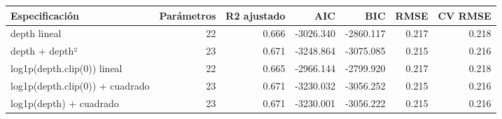 \begin{tabular}{lrrrrrr}
\toprule
Especificación & Parámetros & R2 ajustado & AIC & BIC & RMSE & CV RMSE \\
\midrule
depth lineal & 22 & 0.666 & -3026.340 & -2860.117 & 0.217 & 0.218 \\
depth + depth² & 23 & 0.671 & -3248.864 & -3075.085 & 0.215 & 0.216 \\
log1p(depth.clip(0)) lineal & 22 & 0.665 & -2966.144 & -2799.920 & 0.217 & 0.218 \\
log1p(depth.clip(0)) + cuadrado & 23 & 0.671 & -3230.032 & -3056.252 & 0.215 & 0.216 \\
log1p(depth) + cuadrado & 23 & 0.671 & -3230.001 & -3056.222 & 0.215 & 0.216 \\
\bottomrule
\end{tabular}
